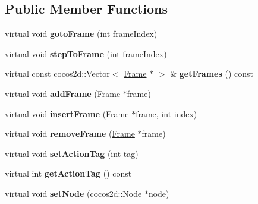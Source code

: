 \subsection*{Public Member Functions}
\begin{DoxyCompactItemize}
\item 
\mbox{\label{classTimeline_a9c8dbb4755075886007c3a5bcc86799d}} 
virtual void {\bfseries goto\+Frame} (int frame\+Index)
\item 
\mbox{\label{classTimeline_a2b2e30e76830051e36f5e5a7b825fcd6}} 
virtual void {\bfseries step\+To\+Frame} (int frame\+Index)
\item 
\mbox{\label{classTimeline_a4a3f3f3d91e93a9692f4445d162f74b6}} 
virtual const cocos2d\+::\+Vector$<$ \hyperlink{classFrame}{Frame} $\ast$ $>$ \& {\bfseries get\+Frames} () const
\item 
\mbox{\label{classTimeline_acf833a87c28f9c4f6ba63cc9b1dd635d}} 
virtual void {\bfseries add\+Frame} (\hyperlink{classFrame}{Frame} $\ast$frame)
\item 
\mbox{\label{classTimeline_a8d0cfcebfee332e6ff884d72aa52b9ac}} 
virtual void {\bfseries insert\+Frame} (\hyperlink{classFrame}{Frame} $\ast$frame, int index)
\item 
\mbox{\label{classTimeline_adc51dabafdfeab061b77e2467884ce21}} 
virtual void {\bfseries remove\+Frame} (\hyperlink{classFrame}{Frame} $\ast$frame)
\item 
\mbox{\label{classTimeline_a3de7aaa04c888ad279e9446a9ef5f060}} 
virtual void {\bfseries set\+Action\+Tag} (int tag)
\item 
\mbox{\label{classTimeline_ac5c3aeaddff18adb0042aeafbaf244f0}} 
virtual int {\bfseries get\+Action\+Tag} () const
\item 
\mbox{\label{classTimeline_a2301dfdfd01194c1ad56050994b52134}} 
virtual void {\bfseries set\+Node} (cocos2d\+::\+Node $\ast$node)
\item 
\mbox{\label{classTimeline_aa540f3f133bfc1b842f822d9b683a491}} 

\end{DoxyCompactItemize}
